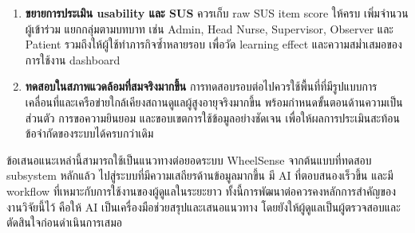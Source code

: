 \begin{enumerate}
    \item \textbf{ขยายการประเมิน usability และ SUS} ควรเก็บ raw SUS item score ให้ครบ เพิ่มจำนวนผู้เข้าร่วม แยกกลุ่มตามบทบาท เช่น Admin, Head Nurse, Supervisor, Observer และ Patient รวมถึงให้ผู้ใช้ทำภารกิจซ้ำหลายรอบ เพื่อวัด learning effect และความสม่ำเสมอของการใช้งาน dashboard

    \item \textbf{ทดสอบในสภาพแวดล้อมที่สมจริงมากขึ้น} การทดสอบรอบต่อไปควรใช้พื้นที่ที่มีรูปแบบการเคลื่อนที่และเครือข่ายใกล้เคียงสถานดูแลผู้สูงอายุจริงมากขึ้น พร้อมกำหนดขั้นตอนด้านความเป็นส่วนตัว การขอความยินยอม และขอบเขตการใช้ข้อมูลอย่างชัดเจน เพื่อให้ผลการประเมินสะท้อนข้อจำกัดของระบบได้ครบกว่าเดิม
\end{enumerate}

ข้อเสนอแนะเหล่านี้สามารถใช้เป็นแนวทางต่อยอดระบบ WheelSense จากต้นแบบที่ทดสอบ subsystem หลักแล้ว ไปสู่ระบบที่มีความเสถียรด้านข้อมูลมากขึ้น มี AI ที่ตอบสนองเร็วขึ้น และมี workflow ที่เหมาะกับการใช้งานของผู้ดูแลในระยะยาว ทั้งนี้การพัฒนาต่อควรคงหลักการสำคัญของงานวิจัยนี้ไว้ คือให้ AI เป็นเครื่องมือช่วยสรุปและเสนอแนวทาง โดยยังให้ผู้ดูแลเป็นผู้ตรวจสอบและตัดสินใจก่อนดำเนินการเสมอ
